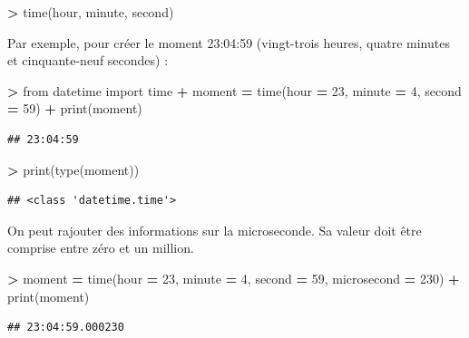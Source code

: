 \documentclass[12pt,]{book}
\newenvironment{Shaded}{\begin{snugshade}}{\end{snugshade}}
\newcommand{\DecValTok}[1]{\textcolor[rgb]{0.00,0.00,0.81}{#1}}
\newcommand{\ImportTok}[1]{#1}
\newcommand{\OperatorTok}[1]{\textcolor[rgb]{0.81,0.36,0.00}{\textbf{#1}}}
\newcommand{\BuiltInTok}[1]{#1}
\newcommand{\NormalTok}[1]{#1}
\numberwithin{equation}{section}
\numberwithin{countremarque}{section}
\begin{document}
\begin{Shaded}
\begin{Highlighting}[]
\OperatorTok{>}\NormalTok{ time(hour, minute, second)}
\end{Highlighting}
\end{Shaded}

Par exemple, pour créer le moment 23:04:59 (vingt-trois heures, quatre
minutes et cinquante-neuf secondes) :

\begin{Shaded}
\begin{Highlighting}[]
\OperatorTok{>} \ImportTok{from}\NormalTok{ datetime }\ImportTok{import}\NormalTok{ time}
\OperatorTok{+}\NormalTok{ moment }\OperatorTok{=}\NormalTok{ time(hour }\OperatorTok{=} \DecValTok{23}\NormalTok{, minute }\OperatorTok{=} \DecValTok{4}\NormalTok{, second }\OperatorTok{=} \DecValTok{59}\NormalTok{)}
\OperatorTok{+} \BuiltInTok{print}\NormalTok{(moment)}
\end{Highlighting}
\end{Shaded}

\begin{lstlisting}
## 23:04:59
\end{lstlisting}

\begin{Shaded}
\begin{Highlighting}[]
\OperatorTok{>} \BuiltInTok{print}\NormalTok{(}\BuiltInTok{type}\NormalTok{(moment))}
\end{Highlighting}
\end{Shaded}

\begin{lstlisting}
## <class 'datetime.time'>
\end{lstlisting}

On peut rajouter des informations sur la microseconde. Sa valeur doit
être comprise entre zéro et un million.

\begin{Shaded}
\begin{Highlighting}[]
\OperatorTok{>}\NormalTok{ moment }\OperatorTok{=}\NormalTok{ time(hour }\OperatorTok{=} \DecValTok{23}\NormalTok{, minute }\OperatorTok{=} \DecValTok{4}\NormalTok{, second }\OperatorTok{=} \DecValTok{59}\NormalTok{, microsecond }\OperatorTok{=} \DecValTok{230}\NormalTok{)}
\OperatorTok{+} \BuiltInTok{print}\NormalTok{(moment)}
\end{Highlighting}
\end{Shaded}

\begin{lstlisting}
## 23:04:59.000230
\end{lstlisting}
\end{document}
